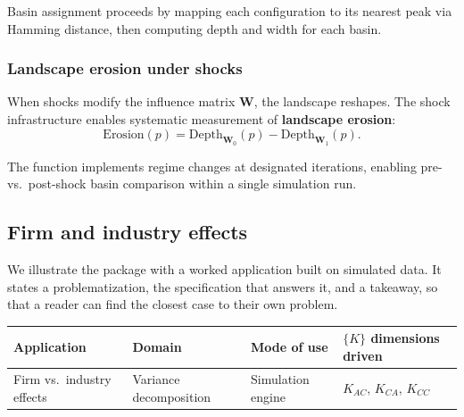 \documentclass[
  article]{jss}
\newcounter{none}
\begin{document}
Basin assignment proceeds by mapping each configuration to its nearest
peak via Hamming distance, then computing depth and width for each
basin.

\subsubsection{Landscape erosion under
shocks}\label{landscape-erosion-under-shocks}

When shocks modify the influence matrix \(\mathbf{W}\), the landscape
reshapes. The  shock infrastructure enables systematic
measurement of \textbf{landscape erosion}:
\begin{equation}\label{eq:erosion}
  \text{Erosion}(p) = \text{Depth}_{\mathbf{W}_0}(p) - \text{Depth}_{\mathbf{W}_1}(p).
\end{equation}

\noindent The  function implements regime
changes at designated iterations, enabling pre- vs.~post-shock basin
comparison within a single simulation run.

\subsection{Firm and industry effects}\label{sec:applications}

We illustrate the package with a worked application built on simulated
data. It states a problematization, the specification that answers it,
and a takeaway, so that a reader can find the closest case to their own
problem.

{\def\LTcaptype{none} %
\begin{longtable}[]{@{}
  >{\raggedright\arraybackslash}p{}
  >{\raggedright\arraybackslash}p{}
  >{\raggedright\arraybackslash}p{}
  >{\raggedright\arraybackslash}p{}@{}}
\toprule\noalign{}
\begin{minipage}[b]{\linewidth}\raggedright
Application
\end{minipage} & \begin{minipage}[b]{\linewidth}\raggedright
Domain
\end{minipage} & \begin{minipage}[b]{\linewidth}\raggedright
Mode of use
\end{minipage} & \begin{minipage}[b]{\linewidth}\raggedright
\(\{K\}\) dimensions driven
\end{minipage} \\
\midrule\noalign{}
\endhead
\bottomrule\noalign{}
\endlastfoot
Firm vs.~industry effects & Variance decomposition & Simulation engine &
\(K_{AC}\), \(K_{CA}\), \(K_{CC}\) \\
\end{longtable}
}
\end{document}
